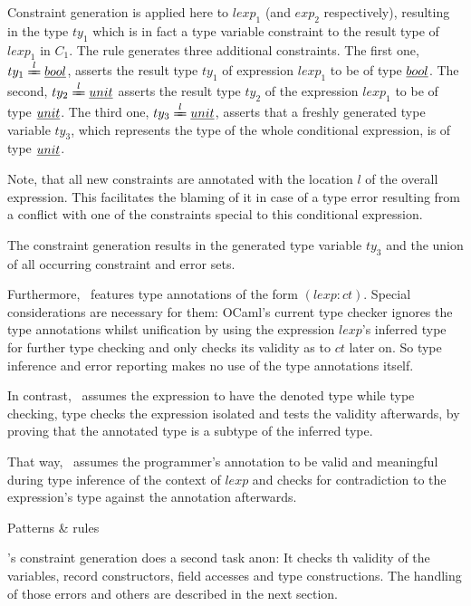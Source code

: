 Constraint generation is applied here to $lexp_1$ (and $exp_2$ respectively),
resulting  in the type $ty_1$ which is in fact a type variable constraint to
the result type of $lexp_1$ in $C_1$.
The rule generates three additional constraints.  The first one, $ty_1
\xlongequal l \type{bool}$, asserts the result type $ty_1$ of expression
$lexp_1$ to be of type $\underline{bool}$.
The second, $ty_2 \xlongequal l \type{unit}$ asserts the result type $ty_2$ of
the expression $lexp_1$ to be of type $\underline{unit}$.
The third one, $ty_3 \xlongequal l \type{unit}$, asserts that a freshly
generated type variable $ty_3$, which represents the type of the whole
conditional expression, is of type $\underline{unit}$.

Note, that all new constraints are annotated with the location $l$ of the
overall expression. This facilitates the blaming of it in case of a type error
resulting from a conflict with one of the constraints special to this
conditional expression.

The constraint generation results in the generated type variable $ty_3$ and the
union of all occurring constraint and error sets.

Furthermore, \easyocaml\ features type annotations of the form $(lexp:ct)$.
Special considerations are necessary for them:
OCaml's current type checker ignores the type annotations whilst unification by
using the expression $lexp$'s inferred type for further type checking and only
checks its validity as to $ct$ later on.  So type inference and error reporting
makes no use of the type annotations itself.

In contrast, \easyocaml\ assumes the expression to have the denoted type while
type checking, type checks the expression isolated and tests the validity
afterwards, by proving that the annotated type is a subtype of the inferred type.

\vspace{1em}\centerline{
}\vspace{1em}

That way, \easyocaml\ assumes the programmer's annotation to be valid and
meaningful during type inference of the context of $lexp$ and checks for
contradiction to the expression's type against the annotation afterwards.

Patterns \& rules\more

\easyocaml's constraint generation does a second task anon: It checks th
validity of the variables, record constructors, field accesses and type
constructions. The handling of those errors and others are described in the
next section.

